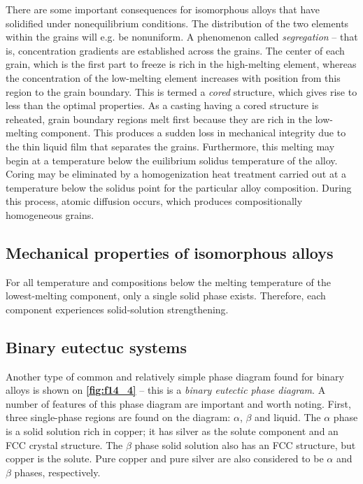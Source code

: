 There are some important consequences for isomorphous alloys that have solidified under nonequilibrium conditions. The distribution of the two elements within the grains will e.g. be nonuniform. A phenomenon called \textit{segregation} -- that is, concentration gradients are established across the grains. The center of each grain, which is the first part to freeze is rich in the high-melting element, whereas the concentration of the low-melting element increases with position from this region to the grain boundary. This is termed a \textit{cored} structure, which gives rise to less than the optimal properties. As a casting having a cored structure is reheated, grain boundary regions melt first because they are rich in the low-melting component. This produces a sudden loss in mechanical integrity due to the thin liquid film that separates the grains. Furthermore, this melting may begin at a temperature below the euilibrium solidus temperature of the alloy. Coring may be eliminated by a homogenization heat treatment carried out at a temperature below the solidus point for the particular alloy composition. During this process, atomic diffusion occurs, which produces compositionally homogeneous grains.


\subsection{Mechanical properties of isomorphous alloys}
For all temperature and compositions below the melting temperature of the lowest-melting component, only a single solid phase exists. Therefore, each component experiences solid-solution strengthening.


\subsection{Binary eutectuc systems}
Another type of common and relatively simple phase diagram found for binary alloys is shown on \textbf{\autoref{fig:f14_4}} -- this is a \textit{binary eutectic phase diagram}. A number of features of this phase diagram are important and worth noting. First, three single-phase regions are found on the diagram: $\alpha$, $\beta$ and liquid. The $\alpha$ phase is a solid solution rich in copper; it has silver as the solute component and an FCC crystal structure. The $\beta$ phase solid solution also has an FCC structure, but copper is the solute. Pure copper and pure silver are also considered to be $\alpha$ and $\beta$ phases, respectively. 

